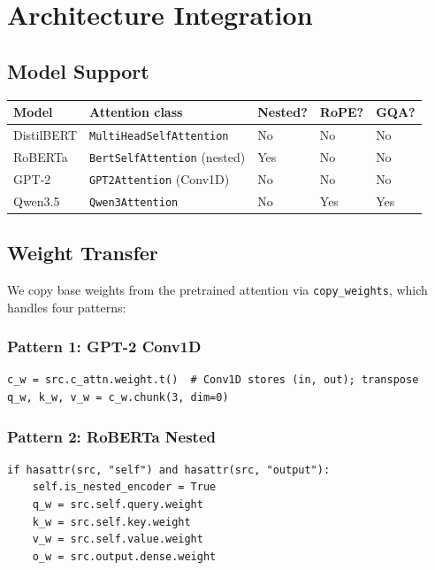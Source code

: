 \section{Architecture Integration}

\subsection{Model Support}

\begin{table}[H]
\centering
\small
\begin{tabular}{lllll}
\toprule
\textbf{Model} & \textbf{Attention class} & \textbf{Nested?} & \textbf{RoPE?} & \textbf{GQA?} \\
\midrule
DistilBERT & \texttt{MultiHeadSelfAttention} & No & No & No \\
RoBERTa & \texttt{BertSelfAttention} (nested) & Yes & No & No \\
GPT-2 & \texttt{GPT2Attention} (Conv1D) & No & No & No \\
Qwen3.5 & \texttt{Qwen3Attention} & No & Yes & Yes \\
\bottomrule
\end{tabular}
\end{table}

\subsection{Weight Transfer}

We copy base weights from the pretrained attention via \texttt{copy\_weights}, which 
handles four patterns:

\subsubsection{Pattern 1: GPT-2 Conv1D}

\begin{lstlisting}
c_w = src.c_attn.weight.t()  # Conv1D stores (in, out); transpose
q_w, k_w, v_w = c_w.chunk(3, dim=0)
\end{lstlisting}

\subsubsection{Pattern 2: RoBERTa Nested}

\begin{lstlisting}
if hasattr(src, "self") and hasattr(src, "output"):
    self.is_nested_encoder = True
    q_w = src.self.query.weight
    k_w = src.self.key.weight
    v_w = src.self.value.weight
    o_w = src.output.dense.weight
\end{lstlisting}


